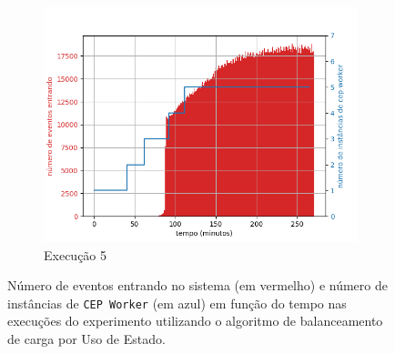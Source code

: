 \begin{figure}[h!]
\begin{subfigure}{.5\textwidth}
  \includegraphics[width=\linewidth]{figuras/graphics/carga_e_workers_total10-dez-su.png}  
  \caption{Execução 5}
  \label{fig:cewt-10-dez-su}
\end{subfigure}
\caption{Número de eventos entrando no sistema (em vermelho) e número de instâncias de \texttt{CEP Worker} (em azul) em função do tempo nas execuções do experimento utilizando o algoritmo de balanceamento de carga por Uso de Estado.}
\label{fig:workers_and_events_SU}
\end{figure}

